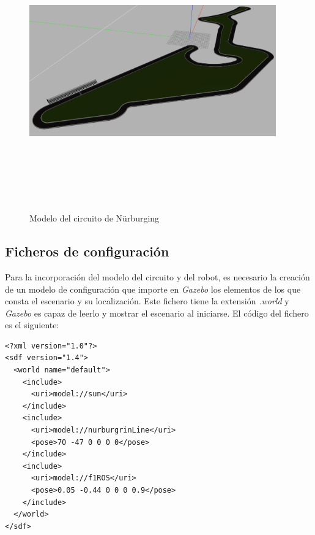 \begin{figure}[H]
  \begin{center}
    \includegraphics[width=0.95\textwidth, height=12cm]{figures/circuito.png}
		\caption{Modelo del circuito de Nürburging}
		\label{fig.circuito}
		\end{center}
\end{figure} 

\subsection{Ficheros de configuración} \label{sec.fichconf}
Para la incorporación del modelo del circuito y del robot, es necesario la creación de un modelo de configuración que importe en \textit{Gazebo} los elementos de los que consta el escenario y su localización. Este fichero tiene la extensión \textit{.world} y \textit{Gazebo} es capaz de leerlo y mostrar el escenario al iniciarse.
El código del fichero es el siguiente:

\lstset{language=XML, breaklines=true, basicstyle=\footnotesize}
\begin{lstlisting}[frame=single]
<?xml version="1.0"?>
<sdf version="1.4">
  <world name="default">
    <include>
      <uri>model://sun</uri>
    </include>
    <include>
      <uri>model://nurburgrinLine</uri>
      <pose>70 -47 0 0 0 0</pose>
    </include>
    <include>
      <uri>model://f1ROS</uri>
      <pose>0.05 -0.44 0 0 0 0.9</pose>
    </include>
  </world>
</sdf>
\end{lstlisting}

